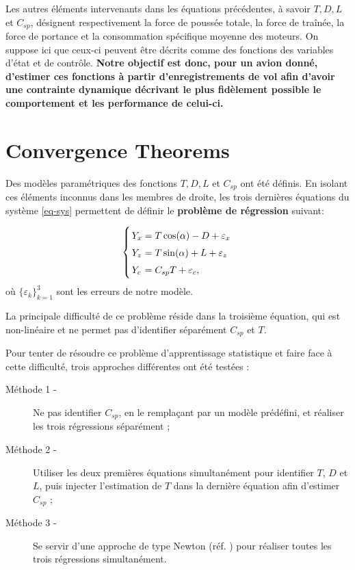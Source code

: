 \documentclass[a0,portrait]{a0poster}
\begin{document}
\begin{multicols}{2}
Les autres éléments intervenants dans les équations précédentes, à savoir $T,D,L$ et $C_{sp}$, désignent respectivement la force de poussée totale, la force de traînée, la force de portance et la consommation spécifique moyenne des moteurs. On suppose ici que ceux-ci peuvent être décrits comme des fonctions des variables d'état et de contrôle. \textbf{Notre objectif est donc, pour un avion donné, d'estimer ces fonctions à partir d'enregistrements de vol afin d'avoir une contrainte dynamique décrivant le plus fidèlement possible le comportement et les performance de celui-ci.}

\section{Convergence Theorems}

Des modèles paramétriques des fonctions $T,D,L$ et $C_{sp}$ ont été définis. En isolant ces éléments inconnus dans les membres de droite, les trois dernières équations du système \eqref{eq-sys} permettent de définir le \textbf{problème de régression} suivant:

\begin{equation} \label{eq-regpb}
\left\{
\arraycolsep=1.4pt\def\arraystretch{1.5}
\begin{array}{ll}
Y_x &= T \cos(\alpha) - D + \varepsilon_x \\
Y_z &= T \sin(\alpha) + L + \varepsilon_z \\
Y_c &= C_{sp} T+ \varepsilon_c,
\end{array}
\right.
\end{equation}
où $\{\varepsilon_k\}_{k=1}^3$ sont les erreurs de notre modèle.

La principale difficulté de ce problème réside dans la troisième équation, qui est non-linéaire et ne permet pas d'identifier séparément $C_{sp}$ et $T$.
\newline

Pour tenter de résoudre ce problème d'apprentissage statistique et faire face à cette difficulté, trois approches différentes ont été testées :
\begin{description}
\item[Méthode 1 -] Ne pas identifier $C_{sp}$, en le remplaçant par un modèle prédéfini, et réaliser les trois régressions séparément ;
\item[Méthode 2 -] Utiliser les deux premières équations simultanément pour identifier $T$, $D$ et $L$, puis injecter l'estimation de $T$ dans la dernière équation afin d'estimer $C_{sp}$ ;
\item[Méthode 3 -] Se servir d'une approche de type Newton (réf. \cite{bonnans06}) pour réaliser toutes les trois régressions simultanément.
\end{description}
\vspace{1cm}


\end{multicols}
\end{document}
